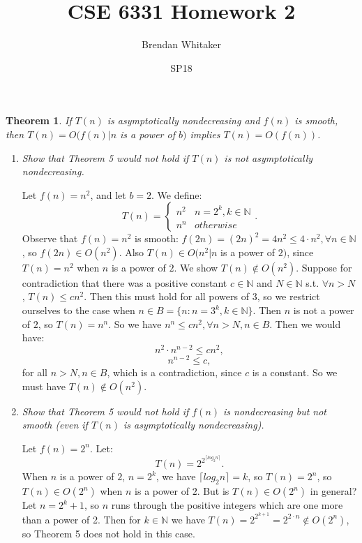 \documentclass[10pt,oneside,reqno]{amsart}
\theoremstyle{plain}
\newtheorem{Thm}{Theorem}
\theoremstyle{definition}
\begin{document}
\title{CSE 6331 Homework 2}

\date{SP18}

\author[Brendan Whitaker]{Brendan Whitaker}

\maketitle
\setcounter{Thm}{4}
\begin{Thm}
If $T(n)$ is asymptotically nondecreasing and $f(n)$ is smooth, then $T(n) = O(f(n)|n$ is a power of $b)$ implies $T(n) = O(f(n))$. 
\end{Thm}
\begin{enumerate}[label=\arabic*.]
\item \textit{Show that Theorem 5 would not hold if $T(n)$ is not asymptotically nondecreasing. }


Let $f(n) = n^2$, and let $b = 2$. We define: 
$$
T(n) = 
\begin{cases}
n^2 & n = 2^k, k \in \mathbb{N}\\
n^n & otherwise
\end{cases}. 
$$
Observe that $f(n) = n^2$ is smooth: $f(2n) = (2n)^2 = 4n^2 \leq 4 \cdot n^2,\forall n \in \mathbb{N}$, so $f(2n) \in O(n^2)$. Also $T(n) \in O(n^2|n$ is a power of $2)$, since $T(n) = n^2$ when $n$ is a power of $2$. We show $T(n) \notin O(n^2)$. Suppose for contradiction that there was a positive constant $c \in \mathbb{N}$ and $N \in \mathbb{N}$ s.t. $\forall n > N$, $T(n) \leq cn^2$. Then this must hold for all powers of $3$, so we restrict ourselves to the case when $n \in B = \{n: n= 3^k,k \in \mathbb{N}\}$. Then $n$ is not a power of $2$, so $T(n) = n^n$. So we have $n^n \leq cn^2,\forall n > N,n \in B$. Then we would have: 
$$
n^2 \cdot n^{n - 2} \leq cn^2,
$$
$$
n^{n - 2} \leq c,
$$
for all $n > N,n \in B$, which is a contradiction, since $c$ is a constant. So we must have $T(n) \notin O(n^2)$. \\


\item \textit{Show that Theorem 5 would not hold if $f(n)$ is nondecreasing but not smooth (even if $T(n)$ is asymptotically nondecreasing). }

Let $f(n) = 2^n$. Let:
$$
T(n) = 2^{2^{\lceil log_2n \rceil}}.
$$
When $n$ is a power of $2$, $n = 2^k$, we have $\lceil log_2n \rceil= k$, so $T(n) = 2^n$, so $T(n) \in O(2^n)$ when $n$ is a power of $2$. But is $T(n) \in O(2^n)$ in general? Let $n = 2^k + 1$, so $n$ runs through the positive integers which are one more than a power of 2. Then for $k \in \mathbb{N}$ we have $T(n) = 2^{2^{k + 1}} = 2^{2 \cdot n} \notin O(2^n)$, so Theorem 5 does not hold in this case. 


\end{enumerate}
\end{document}
